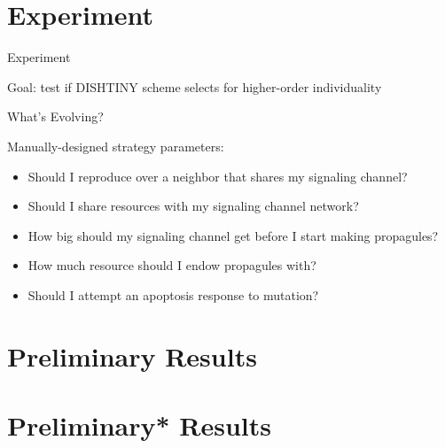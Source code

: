 \section{Experiment}

\begin{frame}{Experiment}

Goal: test if DISHTINY scheme selects for higher-order individuality

\end{frame}

\begin{frame}{What's Evolving?}

Manually-designed strategy parameters:
\pause
\begin{itemize}[<+->]
\item Should I reproduce over a neighbor that shares my signaling channel?
\item Should I share resources with my signaling channel network?
\item How big should my signaling channel get before I start making propagules?
\item How much resource should I endow propagules with?
\item Should I attempt an apoptosis response to mutation?
\end{itemize}
\end{frame}

\section{Preliminary Results}
\section{Preliminary\** Results}


